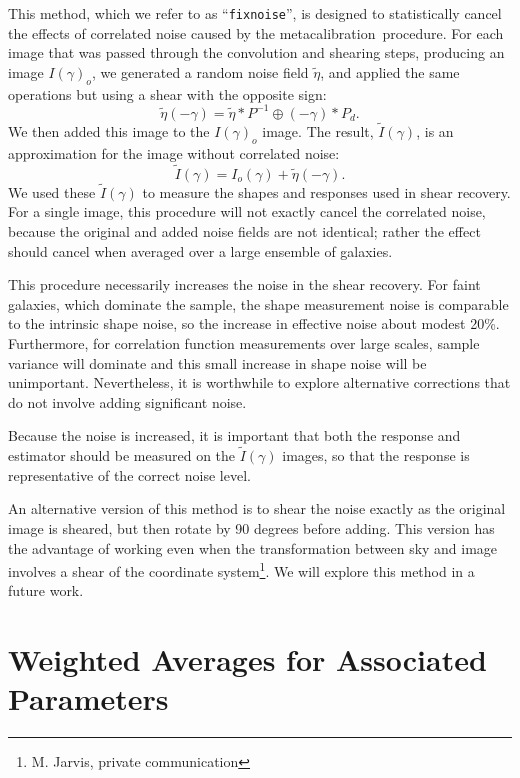 \documentclass[a4paper,fleqn,usenatbib]{mnras}
\newcommand{\mcal}{metacalibration}
\newcommand{\fixnoise}{\texttt{fixnoise}}
\begin{document}
This method, which we refer to as ``\fixnoise'', is designed to statistically
cancel the effects of correlated noise caused by the \mcal\ procedure.  For each
image that was passed through the convolution and shearing steps, producing
an image $I(\gamma)_o$, we generated a random noise field
$\tilde{\eta}$, and applied the same operations but using a shear with
the opposite sign:
\begin{equation}
    \tilde{\eta}(-\gamma) = \tilde{\eta} \ast P^{-1} \oplus (-\gamma) \ast P_{d}.
\end{equation}
We then added this image to the $I(\gamma)_o$ image.
The result, $\tilde{I}(\gamma)$, is an approximation for the image
without correlated noise:
\begin{equation}
    \tilde{I}(\gamma) = I_o(\gamma) + \tilde{\eta}(-\gamma).
\end{equation}
We used these $\tilde{I}(\gamma)$ to measure the shapes and responses used in
shear recovery.  For a single image, this procedure will not exactly cancel the
correlated noise, because the original and added noise fields are not
identical; rather the effect should cancel when averaged over a large ensemble
of galaxies.

This procedure necessarily increases the noise in the shear recovery.  For
faint galaxies, which dominate the sample, the shape measurement noise is
comparable to the intrinsic shape noise, so the increase in effective noise
about modest 20\%.  Furthermore, for correlation function measurements over
large scales, sample variance will dominate and this small increase in shape
noise will be unimportant.  Nevertheless, it is worthwhile to explore
alternative corrections that do not involve adding significant noise.

Because the noise is increased, it is important that both the response and
estimator should be measured on the $\tilde{I}(\gamma)$ images, so that the
response is representative of the correct noise level.

An alternative version of this method is to shear the noise exactly as the
original image is sheared, but then rotate by 90 degrees before adding.  This
version has the advantage of working even when the transformation between sky
and image involves a shear of the coordinate system\footnote{M. Jarvis, private
communication}. We will explore this method in a future work.

\section{Weighted Averages for Associated Parameters} \label{sec:weighting}
\end{document}
